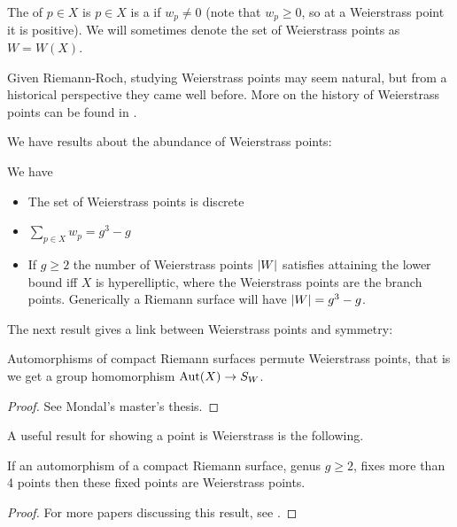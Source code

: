 \documentclass{article}
\begin{document}
\begin{definition}
	The  of $p \in X$ is 
	$p \in X$ is a  if $w_p \neq 0$ (note that $w_p \geq 0$, so at a Weierstrass point it is positive). We will sometimes denote the set of Weierstrass points as $W=W(X)$. 
\end{definition}
\begin{remark}
	Given Riemann-Roch, studying Weierstrass points may seem natural, but from a historical perspective they came well before. More on the history of Weierstrass points can be found in \cite{DelCentina2008}. 
\end{remark}
We have results about the abundance of Weierstrass points:
\begin{prop}
	We have 
	\begin{itemize}
		\item The set of Weierstrass points is discrete
		\item $\sum_{p \in X} w_p = g^3-g$
		\item If $g\geq 2$ the number of Weierstrass points $\left\lvert W \right\rvert$ satisfies 
		attaining the lower bound iff $X$ is hyperelliptic, where the Weierstrass points are the branch points. Generically a Riemann surface will have $\left\lvert W \right\rvert=g^3-g$. 
	\end{itemize}
\end{prop}

The next result gives a link between Weierstrass points and symmetry:
\begin{theorem}
	Automorphisms of compact Riemann surfaces permute Weierstrass points, that is we get a group homomorphism $\operatorname{Aut}(X) \to S_{W}$. 
\end{theorem}
\begin{proof}
	See Mondal's master's thesis. 
\end{proof}

A useful result for showing a point is Weierstrass is the following. 
\begin{prop}
	If an automorphism of a compact Riemann surface, genus $g \geq 2$, fixes more than 4 points then these fixed points are Weierstrass points. 
\end{prop}
\begin{proof}
For more papers discussing this result, see \cite{Magaard2006, Laing2010}. 	
\end{proof}

\end{document}
